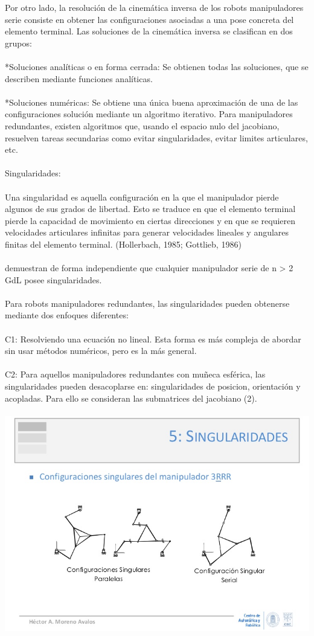\documentclass[12pt,a4paper]{article}
\begin{document}
Por otro lado, la resolución de la cinemática inversa de los robots manipuladores serie consiste en obtener las configuraciones asociadas a una pose concreta del elemento terminal. Las soluciones de la cinemática inversa se clasifican en dos grupos:
\\\\
*Soluciones analíticas o en forma cerrada: Se obtienen todas las soluciones, que se describen mediante funciones analíticas.
\\\\
*Soluciones numéricas: Se obtiene una única buena aproximación de una de las configuraciones solución mediante un algoritmo iterativo. Para manipuladores redundantes, existen algoritmos que, usando el espacio nulo del jacobiano, resuelven tareas secundarias como evitar singularidades, evitar limites articulares, etc. 
\\\\
Singularidades: 
\\\\Una singularidad es aquella configuración en la que el manipulador pierde algunos de sus grados de libertad. Esto se traduce en que el elemento terminal pierde la capacidad de movimiento en ciertas direcciones y en que se requieren velocidades articulares infinitas para generar velocidades lineales y angulares finitas del elemento terminal. (Hollerbach, 1985; Gottlieb, 1986) 
\\\\
demuestran de forma independiente que cualquier manipulador serie de n > 2 GdL posee singularidades. 
\\\\
Para robots manipuladores redundantes, las singularidades pueden obtenerse mediante dos enfoques diferentes: 
\\\\
C1: Resolviendo una ecuación no lineal. Esta forma es más compleja de abordar sin usar métodos numéricos, pero es la más general. 
\\\\
C2: Para aquellos manipuladores redundantes con muñeca esférica, las singularidades pueden desacoplarse en: singularidades de posicion, orientación y acopladas. Para ello se consideran las submatrices del jacobiano (2). 
\\\\
\includegraphics[scale=0.6]{robots-paralelos-conceptos-y-aplicaciones-22-728.jpg} 
\end{document}
